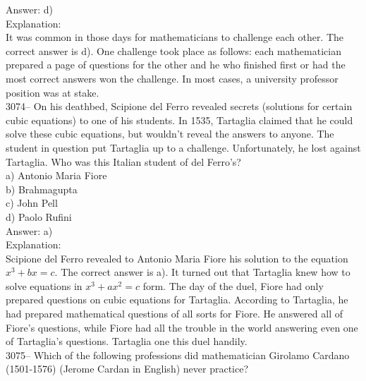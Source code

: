 \documentclass[letterpaper, 12pt]{article}
\begin{document}
Answer: d)\\

Explanation:\\
It was common in those days for mathematicians to challenge each other. The correct answer is d). One challenge took place as follows: each mathematician prepared a page of questions for the other and he who finished first or had the most correct answers won the challenge. In most cases, a university professor position was at stake.\\



3074-- On his deathbed, Scipione del Ferro revealed secrets (solutions for certain cubic equations) to one of his students. In 1535, Tartaglia claimed that he could solve these cubic equations, but wouldn't reveal the answers to anyone. The student in question put Tartaglia up to a challenge. Unfortunately, he lost against Tartaglia. Who was this Italian student of del Ferro's?\\

a) Antonio Maria Fiore\\
b) Brahmagupta\\
c) John Pell\\
d) Paolo Rufini\\

Answer: a)\\

Explanation:\\
Scipione del Ferro revealed to Antonio Maria Fiore his solution to the equation $x^{3} + bx = c$. The correct answer is a). It turned out that Tartaglia knew how to solve equations in $x^{3} + ax^{2} = c$ form. The day of the duel, Fiore had only prepared questions on cubic equations for Tartaglia. According to Tartaglia, he had prepared mathematical questions of all sorts for Fiore. He answered all of Fiore's questions, while Fiore had all the trouble in the world answering even one of Tartaglia's questions. Tartaglia one this duel handily.\\



3075-- Which of the following professions did mathematician Girolamo Cardano (1501-1576) (Jerome Cardan in English) never practice?\\
\end{document}
